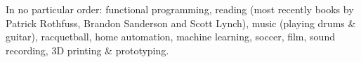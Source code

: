 
\begin{cvparagraph}
  In no particular order: functional programming, reading (most recently books by Patrick Rothfuss, Brandon Sanderson and Scott Lynch), music (playing drums \& guitar), racquetball, home automation, machine learning, soccer, film, sound recording, 3D printing \& prototyping.
\end{cvparagraph}
